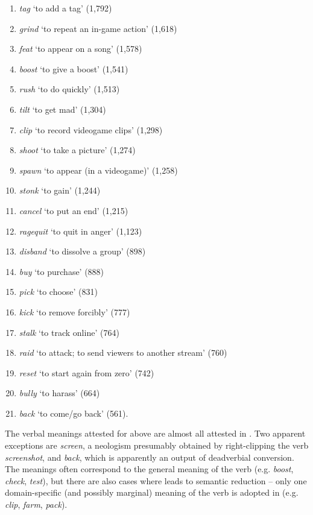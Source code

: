 \documentclass[output=paper,colorlinks,citecolor=brown]{langscibook}
\begin{document}
\begin{enumerate}[itemsep=2pt, parsep=0pt]
	\emph{play} `to entertain oneself' (1,825)
	\item
	\emph{tag} `to add a tag' (1,792)
	\item
	\emph{grind} `to repeat an in-game action' (1,618)
	\item
	\emph{feat} `to appear on a song' (1,578)
	\item
	\emph{boost} `to give a boost' (1,541)
	\item
	\emph{rush} `to do quickly' (1,513)
	\item
	\emph{tilt} `to get mad' (1,304)
	\item
	\emph{clip} `to record videogame clips' (1,298)
	\item
	\emph{shoot} `to take a picture' (1,274)
	\item
	\emph{spawn} `to appear (in a videogame)' (1,258)
	\item
	\emph{stonk} `to gain' (1,244)
	\item
	\emph{cancel} `to put an end' (1,215)
	\item
	\emph{ragequit} `to quit in anger' (1,123)
	\item
	\emph{disband} `to dissolve a group' (898)
	\item
	\emph{buy} `to purchase' (888)
	\item
	\emph{pick} `to choose' (831)
	\item
	\emph{kick} `to remove forcibly' (777)
	\item
	\emph{stalk} `to track online' (764)
	\item
	\emph{raid} `to attack; to send viewers to another stream' (760)
	\item
	\emph{reset} `to start again from zero' (742)
	\item
	\emph{bully} `to harass' (664)
	\item
	\emph{back} `to come/go back' (561).
\end{enumerate}

The verbal meanings attested for  above are almost all attested in . Two apparent exceptions are \emph{screen}, a neologism presumably obtained by right-clipping the  verb \emph{screenshot}, and \emph{back}, which is apparently an output of deadverbial conversion. The  meanings often correspond to the general meaning of the  verb (e.g. \emph{boost}, \emph{check}, \emph{test}), but there are also cases where  leads to semantic reduction \citep{alexieva2008, winter-froemel2019} -- only one domain-specific (and possibly marginal) meaning of the  verb is adopted in  (e.g. \emph{clip}, \emph{farm}, \emph{pack}).
\end{document}
